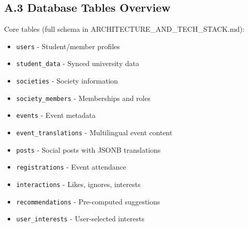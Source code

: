 \documentclass[12pt,a4paper]{article}
\begin{document}
\subsection*{A.3 Database Tables Overview}

Core tables (full schema in ARCHITECTURE\_AND\_TECH\_STACK.md):

\begin{itemize}
    \item \texttt{users} - Student/member profiles
    \item \texttt{student\_data} - Synced university data
    \item \texttt{societies} - Society information
    \item \texttt{society\_members} - Memberships and roles
    \item \texttt{events} - Event metadata
    \item \texttt{event\_translations} - Multilingual event content
    \item \texttt{posts} - Social posts with JSONB translations
    \item \texttt{registrations} - Event attendance
    \item \texttt{interactions} - Likes, ignores, interests
    \item \texttt{recommendations} - Pre-computed suggestions
    \item \texttt{user\_interests} - User-selected interests
\end{itemize}
\end{document}
